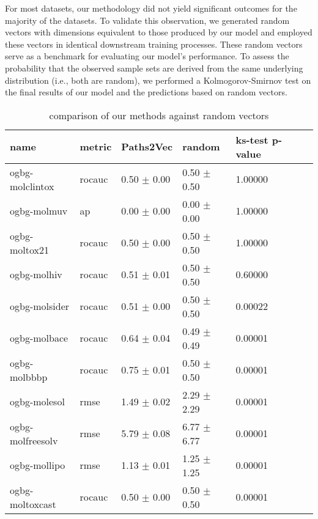 For most datasets, our methodology did not yield significant outcomes for the majority of the datasets. To validate this observation, we generated random vectors with dimensions equivalent to those produced by our model and employed these vectors in identical downstream training processes. These random vectors serve as a benchmark for evaluating our model's performance. To assess the probability that the observed sample sets are derived from the same underlying distribution (i.e., both are random), we performed a Kolmogorov-Smirnov test on the final results of our model and the predictions based on random vectors.

\begin{table}[h!]
    \centering
    \begin{tabular}{@{}lllllll@{}}
        \toprule
        name             & metric & Paths2Vec       & random          & ks-test p-value \\ \midrule
        ogbg-molclintox  & rocauc & 0.50 $\pm$ 0.00 & 0.50 $\pm$ 0.50 & 1.00000         \\
        ogbg-molmuv      & ap     & 0.00 $\pm$ 0.00 & 0.00 $\pm$ 0.00 & 1.00000         \\
        ogbg-moltox21    & rocauc & 0.50 $\pm$ 0.00 & 0.50 $\pm$ 0.50 & 1.00000         \\
        ogbg-molhiv      & rocauc & 0.51 $\pm$ 0.01 & 0.50 $\pm$ 0.50 & 0.60000         \\
        ogbg-molsider    & rocauc & 0.51 $\pm$ 0.00 & 0.50 $\pm$ 0.50 & 0.00022         \\
        ogbg-molbace     & rocauc & 0.64 $\pm$ 0.04 & 0.49 $\pm$ 0.49 & 0.00001         \\
        ogbg-molbbbp     & rocauc & 0.75 $\pm$ 0.01 & 0.50 $\pm$ 0.50 & 0.00001         \\
        ogbg-molesol     & rmse   & 1.49 $\pm$ 0.02 & 2.29 $\pm$ 2.29 & 0.00001         \\
        ogbg-molfreesolv & rmse   & 5.79 $\pm$ 0.08 & 6.77 $\pm$ 6.77 & 0.00001         \\
        ogbg-mollipo     & rmse   & 1.13 $\pm$ 0.01 & 1.25 $\pm$ 1.25 & 0.00001         \\
        ogbg-moltoxcast  & rocauc & 0.50 $\pm$ 0.00 & 0.50 $\pm$ 0.50 & 0.00001         \\ \bottomrule
    \end{tabular}
    \caption{comparison of our methods against random vectors}
    \label{table:ogbg-molfreesolv_results}
\end{table}

